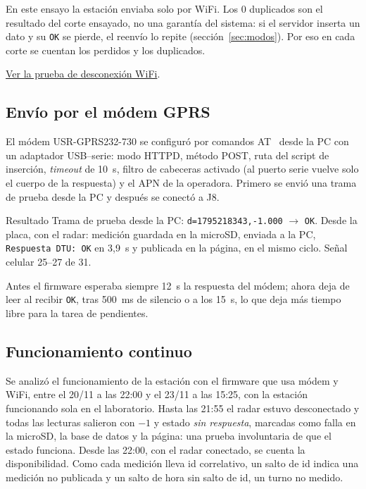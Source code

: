 \documentclass[11pt,a4paper]{article}
\newcommand{\video}[2]{\href{#1}{\textcolor{blue!70!white}{#2}}}
\begin{document}
En este ensayo la estación enviaba solo por WiFi. Los 0 duplicados son el
resultado del corte ensayado, no una garantía del sistema: si el servidor
inserta un dato y su \texttt{OK} se pierde, el reenvío lo repite
(sección~\ref{sec:modos}). Por eso en cada corte se cuentan los perdidos y los
duplicados.

\video{https://www.youtube.com/watch?v=JYUc7e1Hqc8}{Ver la prueba de desconexión WiFi}.

\subsection{Envío por el módem GPRS}

El módem USR-GPRS232-730 se configuró por comandos AT~\cite{usrgprs} desde la PC con un
adaptador USB--serie: modo HTTPD, método POST, ruta del script de inserción,
\emph{timeout} de 10~s, filtro de cabeceras activado (al puerto serie vuelve
solo el cuerpo de la respuesta) y el APN de la operadora. Primero se envió una
trama de prueba desde la PC y después se conectó a J8.

\begin{resultado}{Resultado}
Trama de prueba desde la PC: \texttt{d=1795218343,-1.000} $\to$ \texttt{OK}.
Desde la placa, con el radar: medición guardada en la microSD, enviada a la PC,
\texttt{Respuesta DTU: OK} en 3,9~s y publicada en la página, en el
mismo ciclo. Señal celular 25--27 de 31.
\end{resultado}

Antes el firmware esperaba siempre 12~s la respuesta del módem; ahora deja de
leer al recibir \texttt{OK}, tras 500~ms de silencio o a los 15~s, lo que deja
más tiempo libre para la tarea de pendientes.

\subsection{Funcionamiento continuo}

Se analizó el funcionamiento de la estación con el firmware que usa módem y
WiFi, entre el 20/11 a las 22:00 y el 23/11 a las 15:25, con la estación
funcionando sola en el laboratorio. Hasta las 21:55 el radar estuvo desconectado y todas las lecturas salieron con
$-1$ y estado \emph{sin respuesta}, marcadas como falla en la microSD, la base
de datos y la página: una prueba involuntaria de que el estado funciona. Desde
las 22:00, con el radar conectado, se cuenta la disponibilidad. Como cada
medición lleva id correlativo, un salto de id indica una medición no publicada
y un salto de hora sin salto de id, un turno no medido.
\end{document}
